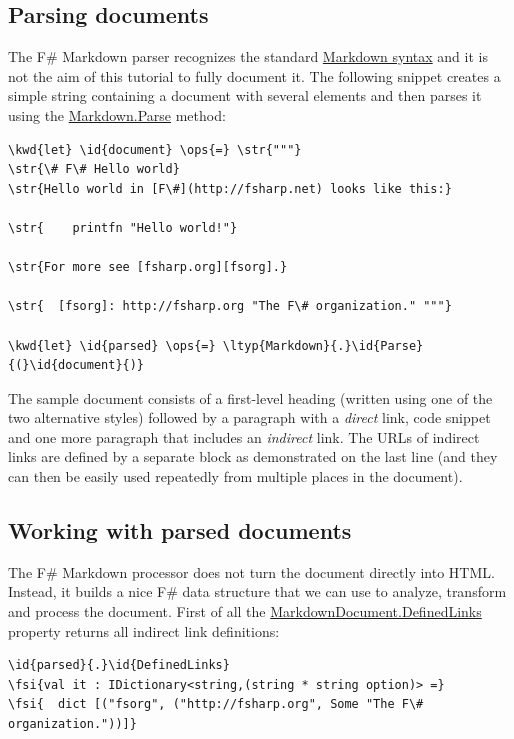 \documentclass{article}
\newcommand{\id}[1]{\textcolor{black}{#1}}
\newcommand{\kwd}[1]{\textcolor{navy}{#1}}
\newcommand{\ops}[1]{\textcolor{purple}{#1}}
\newcommand{\str}[1]{\textcolor{olive}{#1}}
\newcommand{\fsi}[1]{\textcolor{outputcolor}{#1}}
\begin{document}
\subsection*{Parsing documents}



The F\# Markdown parser recognizes the standard \href{http://daringfireball.net/projects/markdown/}{Markdown syntax}
and it is not the aim of this tutorial to fully document it.
The following snippet creates a simple string containing a document
with several elements and then parses it using the \href{https://fsprojects.github.io/FSharp.Formatting/reference/fsharp-formatting-markdown-markdown.html}{Markdown.Parse} method:
\begin{Verbatim}[commandchars=\\\{\}]
\kwd{let} \id{document} \ops{=} \str{"""}
\str{\# F\# Hello world}
\str{Hello world in [F\#](http://fsharp.net) looks like this:}

\str{    printfn "Hello world!"}

\str{For more see [fsharp.org][fsorg].}

\str{  [fsorg]: http://fsharp.org "The F\# organization." """}

\kwd{let} \id{parsed} \ops{=} \ltyp{Markdown}{.}\id{Parse}{(}\id{document}{)}
\end{Verbatim}



The sample document consists of a first-level heading (written using
one of the two alternative styles) followed by a paragraph with a
\emph{direct} link, code snippet and one more paragraph that includes an
\emph{indirect} link. The URLs of indirect links are defined by a separate
block as demonstrated on the last line (and they can then be easily used repeatedly
from multiple places in the document).
\subsection*{Working with parsed documents}



The F\# Markdown processor does not turn the document directly into HTML.
Instead, it builds a nice F\# data structure that we can use to analyze,
transform and process the document. First of all the \href{https://fsprojects.github.io/FSharp.Formatting/reference/fsharp-formatting-markdown-markdowndocument.html\#DefinedLinks}{MarkdownDocument.DefinedLinks} property
returns all indirect link definitions:
\begin{Verbatim}[commandchars=\\\{\}]
\id{parsed}{.}\id{DefinedLinks}
\fsi{val it : IDictionary<string,(string * string option)> =}
\fsi{  dict [("fsorg", ("http://fsharp.org", Some "The F\# organization."))]}
\end{Verbatim}
\end{document}
